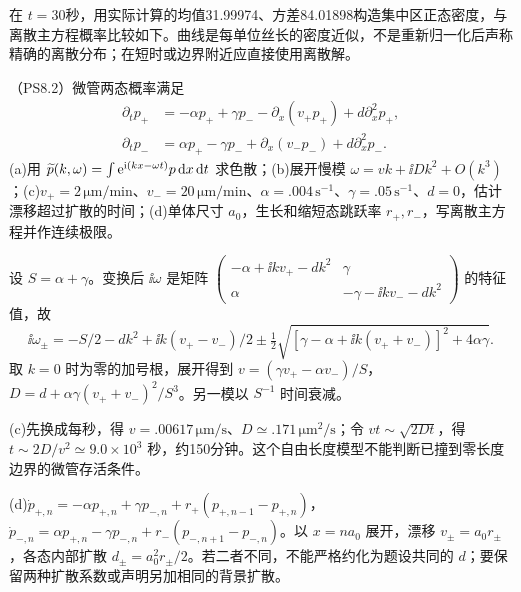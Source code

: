 \begin{solution}
在 $t=30$秒，用实际计算的均值31.99974、方差84.01898构造集中区正态密度，与离散主方程概率比较如下。曲线是每单位丝长的密度近似，不是重新归一化后声称精确的离散分布；在短时或边界附近应直接使用离散解。
\begin{center}\end{center}

\end{solution}

\begin{exercise}
（PS8.2）微管两态概率满足
\begin{align*}
\partial_tp_+&=-\alpha p_++\gamma p_--\partial_x(v_+p_+)+d\partial_x^2p_+,\\
\partial_tp_-&=\alpha p_+-\gamma p_-+\partial_x(v_-p_-)+d\partial_x^2p_-.
\end{align*}
(a)用 $\widetilde p(k,\omega)=\int\mathrm e^{\mathrm i(kx-\omega t)}p\,\mathrm d x\,\mathrm d t$ 求色散；(b)展开慢模 $\omega=vk+\ii Dk^2+O(k^3)$；(c)$v_+=2\,\mathrm{\mu m/min}$、$v_-=20\,\mathrm{\mu m/min}$、$\alpha=.004\,\mathrm{s^{-1}}$、$\gamma=.05\,\mathrm{s^{-1}}$、$d=0$，估计漂移超过扩散的时间；(d)单体尺寸 $a_0$，生长和缩短态跳跃率 $r_+,r_-$，写离散主方程并作连续极限。
\end{exercise}
\begin{solution}
设 $S=\alpha+\gamma$。变换后 $\ii\omega$ 是矩阵 $\left(\begin{smallmatrix}-\alpha+\ii kv_+-dk^2&\gamma\\\alpha&-\gamma-\ii kv_--dk^2\end{smallmatrix}\right)$ 的特征值，故
\[
\ii\omega_\pm=-S/2-dk^2+\ii k(v_+-v_-)/2
\pm\tfrac12\sqrt{[\gamma-\alpha+\ii k(v_++v_-)]^2+4\alpha\gamma}.
\]
取 $k=0$ 时为零的加号根，展开得到 $v=(\gamma v_+-\alpha v_-)/S$，$D=d+\alpha\gamma(v_++v_-)^2/S^3$。另一模以 $S^{-1}$ 时间衰减。

(c)先换成每秒，得 $v=.00617\,\mathrm{\mu m/s}$、$D\simeq.171\,\mathrm{\mu m^2/s}$；令 $vt\sim\sqrt{2Dt}$，得 $t\sim2D/v^2\simeq9.0\times10^3$ 秒，约150分钟。这个自由长度模型不能判断已撞到零长度边界的微管存活条件。

(d)$\dot p_{+,n}=-\alpha p_{+,n}+\gamma p_{-,n}+r_+(p_{+,n-1}-p_{+,n})$，$\dot p_{-,n}=\alpha p_{+,n}-\gamma p_{-,n}+r_-(p_{-,n+1}-p_{-,n})$。以 $x=na_0$ 展开，漂移 $v_\pm=a_0r_\pm$，各态内部扩散 $d_\pm=a_0^2r_\pm/2$。若二者不同，不能严格约化为题设共同的 $d$；要保留两种扩散系数或声明另加相同的背景扩散。
\end{solution}

